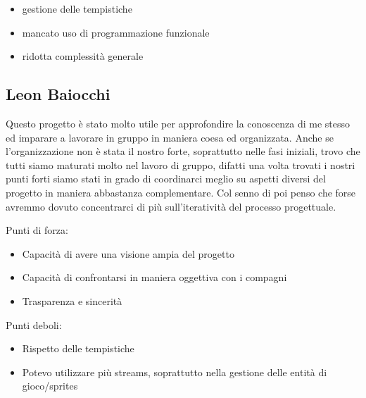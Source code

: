 \begin{itemize}
	\item gestione delle tempistiche
	\item mancato uso di programmazione funzionale
	\item ridotta complessità generale
\end{itemize}


\subsection*{Leon Baiocchi}
Questo progetto è stato molto utile per approfondire la conoscenza di me stesso ed imparare a lavorare in gruppo in maniera coesa ed organizzata. Anche se l'organizzazione non è stata il nostro forte, soprattutto nelle fasi iniziali, trovo che tutti siamo maturati molto nel lavoro di gruppo, difatti una volta trovati i nostri punti forti siamo stati in grado di coordinarci meglio su aspetti diversi del progetto in maniera abbastanza complementare. Col senno di poi penso che forse avremmo dovuto concentrarci di più sull'iteratività del processo progettuale.

\textsf{\small }

\begin{flushleft}
	
\textsf{\small Punti di forza:}\\

\begin{itemize}
	\item \textsf{\small Capacità di avere una visione ampia del progetto} 
	\item \textsf{\small Capacità di confrontarsi in maniera oggettiva con i compagni}
	\item \textsf{\small Trasparenza e sincerità}
\end{itemize}

\textsf{\small Punti deboli: }\\

\begin{itemize}
	\item \textsf{\small Rispetto delle tempistiche}
	\item \textsf{\small Potevo utilizzare più streams, soprattutto nella gestione delle entità di gioco/sprites}
\end{itemize}

\end{flushleft}


